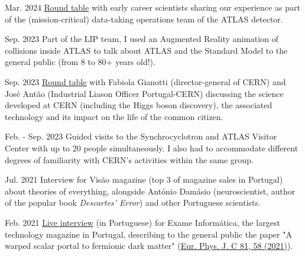 
\begin{cventries}
    
    {}{Mar. 2024}
    {\href{https://indico.cern.ch/event/1378416/overview}{Round table} with early career scientists sharing our experience as part of the (mission-critical) data-taking operations team of the ATLAS detector.}


    {}{Sep. 2023}
    {Part of the LIP team, I used an Augmented Reality animation of collisions inside ATLAS to talk about ATLAS and the Standard Model to the general public (from 8 to 80+ years old!).} 

    {}{Sep. 2023}
    {\href{https://www.cienciaviva.pt/divulgacao-cientifica/o-bosao-de-higgs-e-as-nossas-vidas}{Round table} with Fabiola Gianotti (director-general of CERN) and José Antão (Industrial Liason Officer Portugal-CERN) discussing the science developed at CERN (including the Higgs boson discovery), the associated technology and its impact on the life of the common citizen.}

    {}{Feb. - Sep. 2023}
    {Guided visits to the Synchrocyclotron and ATLAS Visitor Center with up to 20 people simultaneously. I also had to accommodate different degrees of familiarity with CERN's activities within the same group.}

    {}{Jul. 2021}
    {Interview for Visão magazine (top 3 of magazine sales in Portugal) about theories of everything, alongside António Damásio (neuroscientist, author of the popular book \textit{Descartes' Error}) and other Portuguese scientists.}


    {}{Feb. 2021}
    {\href{https://visao.pt/exameinformatica/videos-ei/eilive/2021-02-08-cromo-da-semana-novas-particulas-atomicas-e-a-quinta-dimensao/}{Live interview} (in Portuguese) for Exame Informática, the largest technology magazine in Portugal, describing to the general public the paper "A warped scalar portal to fermionic dark matter" (\href{https://doi.org/10.1140/epjc/s10052-021-08851-0}{Eur. Phys. J. C 81, 58 (2021)}). }


\end{cventries}
